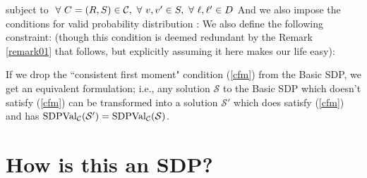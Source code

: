 subject to $\ \forall \  C = (R, S) \in \mathcal{C},\ \forall \  v, v' \in S, \ \forall \  \ell, \ell' \in D $
And we also impose the conditions for valid probability distribution : 
We also define the following constraint: (though this condition is deemed redundant by the Remark \ref{remark01} that follows, but explicitly assuming it here makes our life easy): 

\begin{remark}\label{remark01}
If we drop the ``consistent first moment" condition (\ref{cfm}) from the Basic SDP, we get
an equivalent formulation; i.e., any solution $\mathcal{S}$ to the Basic SDP which doesn't satisfy  (\ref{cfm}) can be transformed into a solution $\mathcal{S}'$ which does satisfy  (\ref{cfm}) and has $\mbox{SDPVal}_{\mathcal{C}}(\mathcal{S}')
= \mbox{SDPVal}_{\mathcal{C}} (\mathcal{S})$.
\end{remark}

\section{How is this an SDP?}

